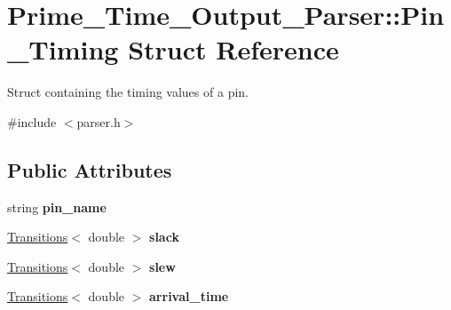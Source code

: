 \hypertarget{structPrime__Time__Output__Parser_1_1Pin__Timing}{\section{Prime\-\_\-\-Time\-\_\-\-Output\-\_\-\-Parser\-:\-:Pin\-\_\-\-Timing Struct Reference}
\label{structPrime__Time__Output__Parser_1_1Pin__Timing}
}


Struct containing the timing values of a pin.  




{\ttfamily \#include $<$parser.\-h$>$}

\subsection*{Public Attributes}
\begin{DoxyCompactItemize}
\item 
\hypertarget{structPrime__Time__Output__Parser_1_1Pin__Timing_adf3b868ae9f5a9cf5fa4605431bef741}{string {\bfseries pin\-\_\-name}}\label{structPrime__Time__Output__Parser_1_1Pin__Timing_adf3b868ae9f5a9cf5fa4605431bef741}

\item 
\hypertarget{structPrime__Time__Output__Parser_1_1Pin__Timing_a9619e81ea7b859c6c600daaaf3754051}{\hyperlink{classTransitions}{Transitions}$<$ double $>$ {\bfseries slack}}\label{structPrime__Time__Output__Parser_1_1Pin__Timing_a9619e81ea7b859c6c600daaaf3754051}

\item 
\hypertarget{structPrime__Time__Output__Parser_1_1Pin__Timing_af7d7bae7417f6586e445c5bb415a1d43}{\hyperlink{classTransitions}{Transitions}$<$ double $>$ {\bfseries slew}}\label{structPrime__Time__Output__Parser_1_1Pin__Timing_af7d7bae7417f6586e445c5bb415a1d43}

\item 
\hypertarget{structPrime__Time__Output__Parser_1_1Pin__Timing_a2737c385dec9bd775aa20f860293fbd0}{\hyperlink{classTransitions}{Transitions}$<$ double $>$ {\bfseries arrival\-\_\-time}}\label{structPrime__Time__Output__Parser_1_1Pin__Timing_a2737c385dec9bd775aa20f860293fbd0}

\end{DoxyCompactItemize}
